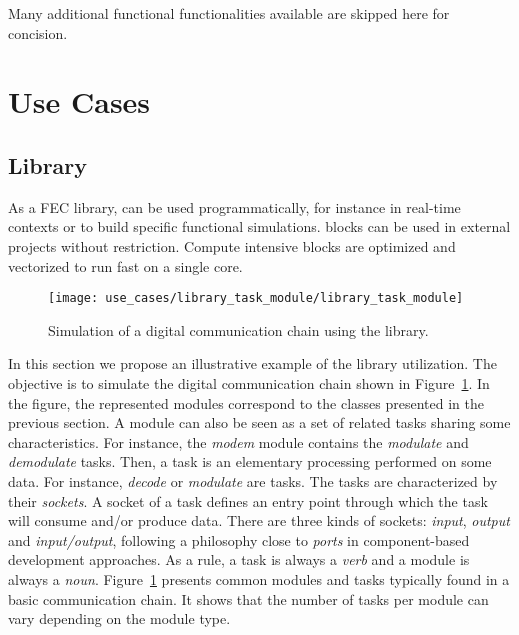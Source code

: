Many additional functional functionalities available are skipped here for
concision.

\section{Use Cases}
\label{sec:aff3ct_use_cases}

\subsection{Library}


As a FEC library, \AFFECT can be used programmatically, for instance in
real-time contexts or to build specific functional simulations. \AFFECT blocks
can be used in external projects without restriction. Compute intensive blocks
are optimized and vectorized to run fast on a single core.


\begin{figure}[htp]
  \centering
  \texttt{[image: use\_cases/library\_task\_module/library\_task\_module]}
  \caption{Simulation of a digital communication chain using the \AFFECT
    library.}
  \label{fig:aff3ct_library_task_module}
\end{figure}

In this section we propose an illustrative example of the \AFFECT library
utilization. The objective is to simulate the digital communication chain shown
in Figure~\ref{fig:aff3ct_library_task_module}. In the figure, the represented
modules correspond to the classes presented in the previous section. A module
can also be seen as a set of related tasks sharing some characteristics. For
instance, the \textit{modem} module contains the \textit{modulate} and
\textit{demodulate} tasks. Then, a task is an elementary processing performed on
some data. For instance, \textit{decode} or \textit{modulate} are tasks. The
tasks are characterized by their \textit{sockets}. A socket of a task defines an
entry point through which the task will consume and/or produce data. There are
three kinds of sockets: \textit{input}, \textit{output} and
\textit{input/output}, following a philosophy close to \emph{ports} in
component-based development approaches. As a rule, a task is always a
\emph{verb} and a module is always a \emph{noun}.
Figure~\ref{fig:aff3ct_library_task_module} presents common modules and tasks
typically found in a basic communication chain. It shows that the number of
tasks per module can vary depending on the module type.

